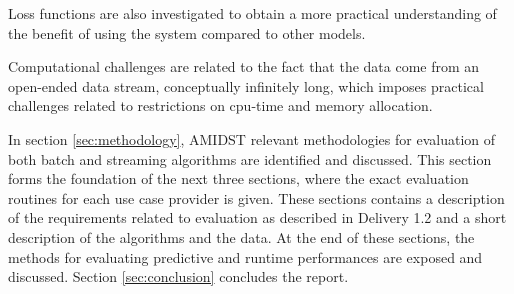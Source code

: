 Loss functions are also investigated to obtain a more practical understanding of the benefit of using the system compared to other models.   


%

Computational challenges are related to the fact that the data come from an open-ended data stream, conceptually infinitely long, which imposes practical challenges related to restrictions on cpu-time and memory allocation.  


In section \ref{sec:methodology}, AMIDST relevant methodologies for evaluation of both batch and streaming algorithms are identified and discussed.  This section forms the foundation of the next three sections, where the exact evaluation routines for each use case provider is given. These sections contains a description of the requirements related to evaluation as described in Delivery 1.2 and a short description of the algorithms and the data.  At the end of these sections, the methods for evaluating predictive and runtime performances are exposed and discussed.  Section \ref{sec:conclusion} concludes the report.

%



%
%
